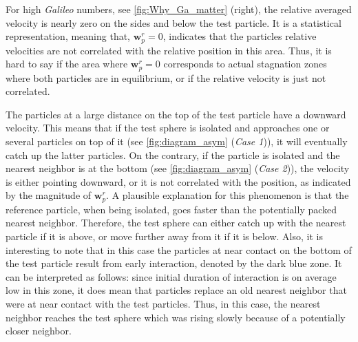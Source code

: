 

For high \textit{Galileo} numbers, see \ref{fig:Why_Ga_matter} (right), the relative averaged velocity is nearly zero on the sides and below the test particle. 
It is a statistical representation, meaning that, $\textbf{w}_p^r = 0$, indicates that the particles relative  velocities are not correlated with the relative position in this area. 
Thus, it is hard to say if the area where $\textbf{w}_p^r = 0$ corresponds to actual stagnation zones where both particles are in equilibrium, or if the relative velocity is just not correlated. 

The particles at a large distance on the top of the test particle have a downward velocity. 
This means that if the test sphere is isolated and approaches one or several  particles on top of it (see \ref{fig:diagram_asym} (\textit{Case 1})), it will eventually catch up the latter particles. 
On the contrary, if the particle is isolated and the nearest neighbor is at the bottom (see \ref{fig:diagram_asym} (\textit{Case 2})), the velocity is either pointing downward, or it is not correlated with the position, as indicated by the magnitude of $\textbf{w}_p^r$. 
A plausible explanation for this phenomenon is that the reference particle, when being isolated, goes faster than the potentially packed nearest neighbor.
Therefore, the test sphere can either catch up with the nearest particle if it is above, or move further away from it if it is below.
Also, it is interesting to note that in this case the particles at near contact on the bottom of the test particle result from early interaction, denoted by the dark blue zone. 
It can be interpreted as follows: since 
initial duration of interaction is on average low in this zone, it does mean that particles replace an old nearest neighbor that were at near contact with the test particles. 
Thus, in this case, the nearest neighbor reaches the test sphere which was rising slowly because of a potentially closer neighbor. 

